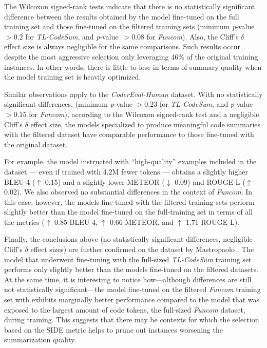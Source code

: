 The Wilcoxon signed-rank tests indicate that there is no statistically significant difference between the results obtained by the model fine-tuned on the full training set and those fine-tuned on the filtered training sets (minimum \textit{p}-value~$> 0.2$ for \textit{TL-CodeSum}, and \textit{p}-value~$> 0.08$ for \textit{Funcom}). Also, the Cliff's $\delta$ effect size is always negligible for the same comparisons. Such results occur despite the most aggressive selection only leveraging 46\% of the original training instances. In other words, there is little to lose in terms of summary quality when the model training set is heavily optimized.

Similar observations apply to the \textit{CoderEval-Human} dataset. With no statistically significant differences, (minimum \textit{p}-value $> 0.23$ for \textit{TL-CodeSum}, and \textit{p}-value $> 0.15$ for \textit{Funcom}), according to the Wilcoxon signed-rank test and a negligible Cliff's $\delta$ effect size, the models specialized to produce meaningful code summaries with the filtered dataset have comparable performance to those fine-tuned with the original dataset.

For example, the model instructed with ``high-quality'' examples included in the  dataset --- even if trained with 4.2M fewer tokens --- obtains a slightly higher BLEU-4 ($\uparrow$ 0.15) and a slightly lower METEOR ($\downarrow$ 0.09) and ROUGE-L ($\uparrow$ 0.02). We also observed no substantial differences in the context of \textit{Funcom}. In this case, however, the models fine-tuned with the filtered training sets perform slightly better than the model fine-tuned on the full-training set in terms of all the metrics ($\uparrow$ 0.85 BLEU-4, $\uparrow$ 0.66 METEOR, and $\uparrow$ 1.71 ROUGE-L).

Finally, the conclusions above (no statistically significant differences, negligible Cliff's $\delta$ effect sizes) are further confirmed on the dataset by Mastropaolo \etal \cite{mastropaolo2023robustness}.
The model that underwent fine-tuning with the full-sized \textit{TL-CodeSum} training set performs only slightly better than the models fine-tuned on the filtered datasets. At the same time, it is interesting to notice how---although differences are still not statistically significant---the model fine-tuned on the filtered \textit{Funcom} training set with  exhibits marginally better performance compared to the model that was exposed to the largest amount of code tokens, \ie the full-sized \textit{Funcom} dataset, during training. This suggests that there may be contexts for which the selection based on the SIDE metric helps to prune out instances worsening the summarization quality.

